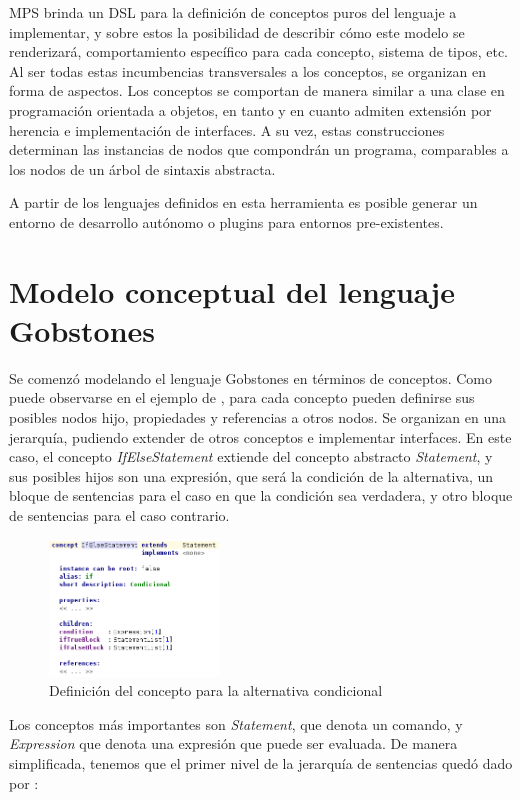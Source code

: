 MPS brinda un DSL para la definición de conceptos puros del lenguaje a implementar, y sobre estos la posibilidad de describir cómo este modelo se renderizará, comportamiento específico para cada concepto, sistema de tipos, etc. Al ser todas estas incumbencias transversales a los conceptos, se organizan en forma de aspectos.
Los conceptos se comportan de manera similar a una clase en programación orientada a objetos, en tanto y en cuanto admiten extensión por herencia e implementación de interfaces. A su vez, estas construcciones determinan las instancias de nodos que compondrán un programa, comparables a los nodos de un árbol de sintaxis abstracta.

A partir de los lenguajes definidos en esta herramienta es posible generar un entorno de desarrollo autónomo o plugins para entornos pre-existentes.

\section{Modelo conceptual del lenguaje Gobstones}\label{dominio}

Se comenzó modelando el lenguaje Gobstones en términos de conceptos. Como puede observarse en el ejemplo de , para cada concepto pueden definirse sus posibles nodos hijo, propiedades y referencias a otros nodos. Se organizan en una jerarquía, pudiendo extender de otros conceptos e implementar interfaces. En este caso, el concepto \textit{IfElseStatement} extiende del concepto abstracto \textit{Statement}, y sus posibles hijos son una expresión, que será la condición de la alternativa, un bloque de sentencias para el caso en que la condición sea verdadera, y otro bloque de sentencias para el caso contrario.

\begin{figure}[hb]
\centering
\includegraphics[width=0.4\textwidth]{assets/ifElse_concept}
\caption{Definición del concepto para la alternativa condicional}
\label{fig:ifElse_concept}
\end{figure}

Los conceptos más importantes son \textit{Statement}, que denota un comando, y \textit{Expression} que denota una expresión que puede ser evaluada. De manera simplificada, tenemos que el primer nivel de la jerarquía de sentencias quedó dado por
\vspace{8mm}:

